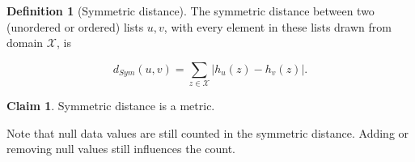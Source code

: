 \documentclass[11pt,a4paper]{article}
\theoremstyle{definition}
\newtheorem{definition}[theorem]{Definition}
\newtheorem{claim}{Claim}
\newcommand{\MultiSet}{\mathrm{MultiSet}}
\begin{document}



\begin{definition}[Symmetric distance]

The symmetric distance between two (unordered or ordered) lists $u,v$, with every element in these lists drawn from domain $\mathcal{X}$, is

\begin{equation}
    d_{Sym}(u,v)=\sum_{z\in \mathcal{X}} |h_u(z)- h_v(z)|.
\end{equation}
    
\end{definition}

\begin{claim}
Symmetric distance is a metric.
\end{claim}

Note that null data values are still counted in the symmetric distance. Adding or removing null values still influences the count.
\end{document}
